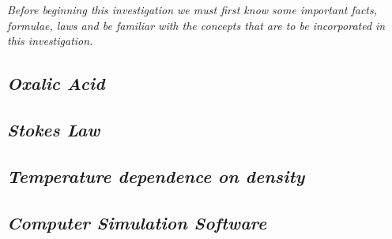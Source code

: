 \textit{Before beginning this investigation we must first know some important facts, formulae, laws and be familiar with the concepts that are to be incorporated in this investigation.}


        
\subsection{\textit{Oxalic Acid}}
        
          
            
\subsection{\textit{Stokes Law}}\label{slaw}
            


\subsection{\textit{Temperature dependence on density}}
            

            
\subsection{\textit{Computer Simulation Software}}
        

        
        


